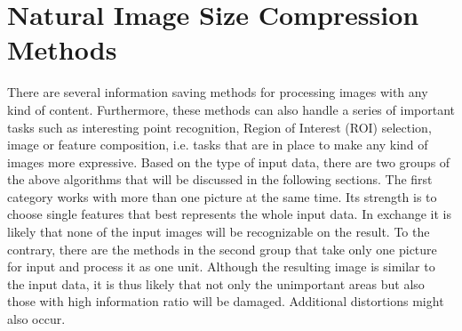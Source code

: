 \documentclass[draft,final]{vutinfth} %
\begin{document}
	\section{Natural Image Size Compression Methods}
	There are several information saving methods for processing images with any kind of content.
	Furthermore, these methods can also handle a series of important tasks such as interesting point recognition, Region of Interest (ROI) selection, image or feature composition, i.e. tasks that are in place to make any kind of images more expressive.
	Based on the type of input data, there are two groups of the above algorithms that will be discussed in the following sections.
	The first category works with more than one picture at the same time.
	Its strength is to choose single features that best represents the whole input data. 
	In exchange it is likely that none of the input images will be recognizable on the result.
	To the contrary, there are the methods in the second group that take only one picture for input and process it as one unit.
	Although the resulting image is similar to the input data, it is thus likely that not only the unimportant areas but also those with high information ratio will be damaged. 
	Additional distortions might also occur.
	
	
\end{document}
